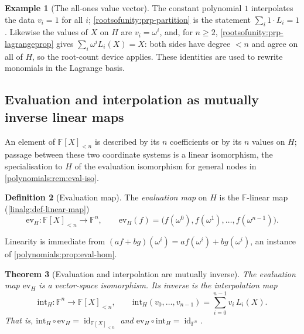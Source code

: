 \documentclass[11pt,a4paper]{article}
\newtheorem{theorem}{Theorem}[section]
\theoremstyle{definition}
\newtheorem{definition}[theorem]{Definition}
\newtheorem{example}[theorem]{Example}
\theoremstyle{remark}
\newcommand{\F}{\ensuremath{\mathbb{F}}}
\DeclareMathOperator{\id}{id}
\begin{document}
\begin{example}[The all-ones value vector]\label{rootsofunity:exp-constants}
The constant polynomial \(1\) interpolates the data \(v_i = 1\) for all
\(i\); \cref{rootsofunity:prp-partition} is the statement
\(\sum_i 1 \cdot L_i = 1\). Likewise the values of \(X\) on \(H\) are
\(v_i = \omega^i\), and, for \(n \ge 2\),
\cref{rootsofunity:prp-lagrangeprop} gives
\(\sum_i \omega^i L_i(X) = X\): both sides have degree \(< n\) and agree
on all of \(H\), so the root-count device applies. These identities are
used to rewrite monomials in the Lagrange basis.
\end{example}

\subsection{Evaluation and interpolation as mutually inverse linear
maps}\label{rootsofunity:sub-evalinterp}

An element of \(\F[X]_{<n}\) is described by its \(n\) coefficients or
by its \(n\) values on \(H\); passage between these two coordinate
systems is a linear isomorphism, the specialisation to \(H\) of the
evaluation isomorphism for general nodes in
\cref{polynomials:rem:eval-iso}.

\begin{definition}[Evaluation map]\label{rootsofunity:def-evalmap}
The \emph{evaluation map} on \(H\) is the \(\F\)-linear map
(\cref{linalg:def-linear-map})
\[
\mathrm{ev}_H \colon \F[X]_{<n} \longrightarrow \F^n,
\qquad
\mathrm{ev}_H(f)
= \bigl(f(\omega^0), f(\omega^1), \dots, f(\omega^{n-1})\bigr).
\]
\end{definition}

Linearity is immediate from
\((af + bg)(\omega^i) = a f(\omega^i) + b g(\omega^i)\), an instance of
\cref{polynomials:prop:eval-hom}.

\begin{theorem}[Evaluation and interpolation are mutually inverse]
\label{rootsofunity:thm-evaliso}
The evaluation map \(\mathrm{ev}_H\) is a vector-space isomorphism. Its
inverse is the \emph{interpolation map}
\[
\mathrm{int}_H \colon \F^n \longrightarrow \F[X]_{<n},
\qquad
\mathrm{int}_H(v_0, \dots, v_{n-1}) = \sum_{i=0}^{n-1} v_i\, L_i(X).
\]
That is, \(\mathrm{int}_H \circ \mathrm{ev}_H = \id_{\F[X]_{<n}}\) and
\(\mathrm{ev}_H \circ \mathrm{int}_H = \id_{\F^n}\).
\end{theorem}
\end{document}
